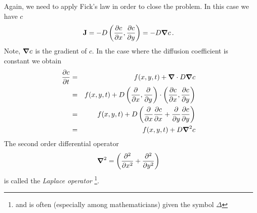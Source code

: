 \begin{example}
	Again, we need to apply Fick's law in order to close the problem. In this case we have $c$
	\begin{equation}
		\mathbf{J} = -D \left(\frac{\partial c}{\partial x}, \frac{\partial
		c}{\partial y}\right) = -D \boldsymbol{\nabla} c \, .
	\end{equation}
	Note, $\boldsymbol{\nabla} c$ is the gradient of $c$. In the case where the diffusion coefficient is constant we obtain
	\begin{eqnarray}
		\frac{\partial c}{\partial t} &=& f(x,y,t) + \boldsymbol{\nabla} \cdot D
		\boldsymbol{\nabla} c \nonumber \\
		&=&  f(x,y,t) + D \left( \frac{\partial}{\partial x},
		\frac{\partial}{\partial y}\right) \cdot 
		\left(\frac{\partial c}{\partial x}, \frac{\partial c}{\partial y}\right)
		\nonumber  \\
		&=& f(x,y,t) + D \left(\frac{\partial}{\partial x}\frac{\partial c}{\partial x}
		+ \frac{\partial}{\partial y}\frac{\partial c}{\partial y} \right) \nonumber \\
		&=& f(x,y,t) + D \boldsymbol{\nabla}^2 c
	\end{eqnarray}
	The second order differential operator 
	\begin{equation}
		\boldsymbol{\nabla}^2 =  
		\left(\frac{\partial^2}{\partial x^2} + \frac{\partial^2}{\partial y^2}
		\right)
	\end{equation}
	is called the \emph{Laplace operator}
	\footnote{and is often (especially among mathematicians) given the symbol $\Delta$}. 


\end{example}
